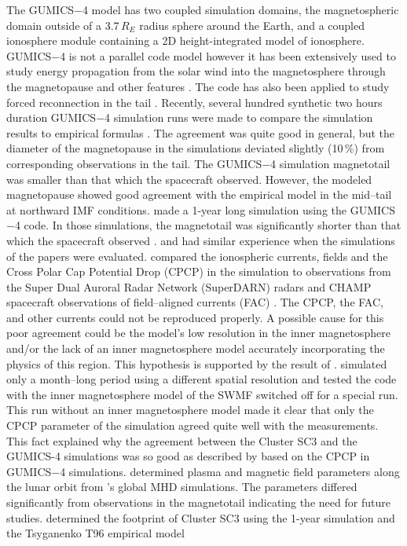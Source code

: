 \documentclass[linenumbers,draft]{agujournal}
\begin{document}
The GUMICS$-$4 model has two coupled simulation domains, the magnetospheric domain outside of a 3.7\,$R_E$ radius sphere around the Earth, and a coupled ionosphere module containing a 2D height-integrated model of ionosphere. GUMICS$-$4 is not a parallel code model however it has been extensively used to study energy propagation from the solar wind into the magnetosphere through the magnetopause and other features \citep[][see the references therein]{janhunen12:_gumic_mhd}. The code has also been applied to study forced reconnection in the tail \citep{voeroes14:_winds_condit_ram_co_ram}. Recently, several hundred synthetic two hours duration GUMICS$-$4 simulation runs were made to compare the simulation results to empirical formulas \citep{gordeev13:_verif_gumic_mhd}. The agreement was quite good in general, but the diameter of the magnetopause in the simulations deviated slightly (10\,\%) from corresponding observations in the tail. The GUMICS$-$4 simulation magnetotail was smaller than that which the spacecraft observed. However, the modeled magnetopause showed good agreement with the empirical model in the mid--tail at northward IMF conditions. \citet{facsko16:_one_earth} made a 1-year long simulation using the GUMICS$-$4 code. In those simulations, the magnetotail was significantly shorter than that which the spacecraft observed \citep{facsko16:_one_earth}. \citet{gordeev13:_verif_gumic_mhd} and \citet{voeroes14:_winds_condit_ram_co_ram} had similar experience when the simulations of the papers were evaluated. \citet{juusola14:_statis_gumic_mhd} compared the ionospheric currents, fields and the Cross Polar Cap Potential Drop (CPCP) in the simulation to observations from the Super Dual Auroral Radar Network (SuperDARN) radars \citep{greenwald95:_darn_super} and CHAMP spacecraft \citep{reigber02:_champ} observations of field--aligned currents (FAC) \citep{juusola07:_hall_peder_champ,ritter04:_ionos_champ_image}. The CPCP, the FAC, and other currents could not be reproduced properly. A possible cause for this poor agreement could be the model's low resolution in the inner magnetosphere and/or the lack of an inner magnetosphere model accurately incorporating the physics of this region. This hypothesis is supported by the result of \citet{haiducek17:_swmf_global_magnet_simul_januar}. \citet{haiducek17:_swmf_global_magnet_simul_januar} simulated only a month--long period using a different spatial resolution and tested the code with the inner magnetosphere model of the SWMF switched off for a special run. This run without an inner magnetosphere model made it clear that only the CPCP parameter of the simulation agreed quite well with the measurements. This fact explained why the agreement between the Cluster SC3 and the GUMICS-4 simulations was so good as described by \citet{lakka18:_cross_polar_cap_satur_gumic,lakka18:_icme_earth_mach} based on the CPCP in GUMICS$-$4 simulations. \citet{kallio15:_proper} determined plasma and magnetic field parameters along the lunar orbit from \citet{facsko16:_one_earth}'s global MHD simulations. The parameters differed significantly from observations in the magnetotail indicating the need for future studies. \citet{facsko16:_one_earth} determined the footprint of Cluster SC3 using the 1-year simulation and the Tsyganenko T96 empirical model 
\end{document}
